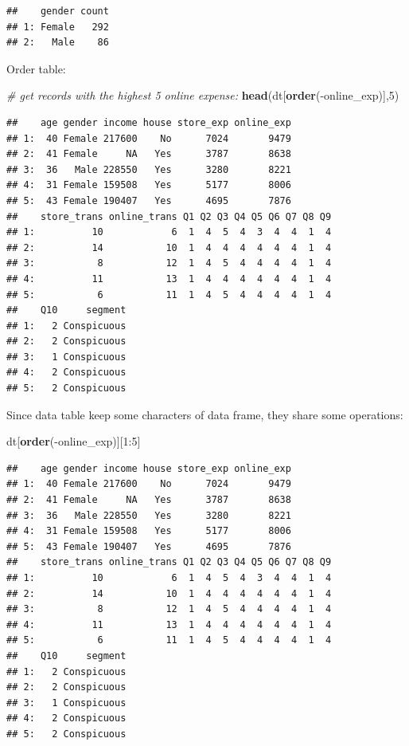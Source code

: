 \documentclass[12pt,]{krantz}
\newenvironment{Shaded}{\begin{snugshade}}{\end{snugshade}}
\newcommand{\KeywordTok}[1]{\textcolor[rgb]{0.13,0.29,0.53}{\textbf{{#1}}}}
\newcommand{\DecValTok}[1]{\textcolor[rgb]{0.00,0.00,0.81}{{#1}}}
\newcommand{\CommentTok}[1]{\textcolor[rgb]{0.56,0.35,0.01}{\textit{{#1}}}}
\newcommand{\NormalTok}[1]{{#1}}
\theoremstyle{definition}
\theoremstyle{definition}
\theoremstyle{remark}
\begin{document}
\begin{verbatim}
##    gender count
## 1: Female   292
## 2:   Male    86
\end{verbatim}

Order table:

\begin{Shaded}
\begin{Highlighting}[]
\CommentTok{# get records with the highest 5 online expense:}
\KeywordTok{head}\NormalTok{(dt[}\KeywordTok{order}\NormalTok{(-online_exp)],}\DecValTok{5}\NormalTok{) }
\end{Highlighting}
\end{Shaded}

\begin{verbatim}
##    age gender income house store_exp online_exp
## 1:  40 Female 217600    No      7024       9479
## 2:  41 Female     NA   Yes      3787       8638
## 3:  36   Male 228550   Yes      3280       8221
## 4:  31 Female 159508   Yes      5177       8006
## 5:  43 Female 190407   Yes      4695       7876
##    store_trans online_trans Q1 Q2 Q3 Q4 Q5 Q6 Q7 Q8 Q9
## 1:          10            6  1  4  5  4  3  4  4  1  4
## 2:          14           10  1  4  4  4  4  4  4  1  4
## 3:           8           12  1  4  5  4  4  4  4  1  4
## 4:          11           13  1  4  4  4  4  4  4  1  4
## 5:           6           11  1  4  5  4  4  4  4  1  4
##    Q10     segment
## 1:   2 Conspicuous
## 2:   2 Conspicuous
## 3:   1 Conspicuous
## 4:   2 Conspicuous
## 5:   2 Conspicuous
\end{verbatim}

Since data table keep some characters of data frame, they share some
operations:

\begin{Shaded}
\begin{Highlighting}[]
\NormalTok{dt[}\KeywordTok{order}\NormalTok{(-online_exp)][}\DecValTok{1}\NormalTok{:}\DecValTok{5}\NormalTok{]}
\end{Highlighting}
\end{Shaded}

\begin{verbatim}
##    age gender income house store_exp online_exp
## 1:  40 Female 217600    No      7024       9479
## 2:  41 Female     NA   Yes      3787       8638
## 3:  36   Male 228550   Yes      3280       8221
## 4:  31 Female 159508   Yes      5177       8006
## 5:  43 Female 190407   Yes      4695       7876
##    store_trans online_trans Q1 Q2 Q3 Q4 Q5 Q6 Q7 Q8 Q9
## 1:          10            6  1  4  5  4  3  4  4  1  4
## 2:          14           10  1  4  4  4  4  4  4  1  4
## 3:           8           12  1  4  5  4  4  4  4  1  4
## 4:          11           13  1  4  4  4  4  4  4  1  4
## 5:           6           11  1  4  5  4  4  4  4  1  4
##    Q10     segment
## 1:   2 Conspicuous
## 2:   2 Conspicuous
## 3:   1 Conspicuous
## 4:   2 Conspicuous
## 5:   2 Conspicuous
\end{verbatim}
\end{document}
